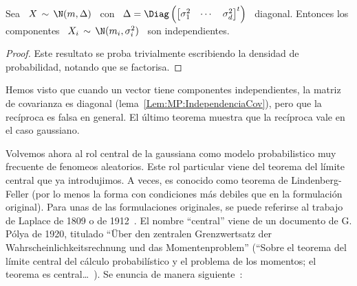 %
\begin{teorema}[Independencia]
\label{Teo:MP:IndependenciaGaussiana}
%
  Sea   \   $X  \,   \sim   \,   \N(m,\Delta)$  \   con   \   $\Delta  =   \Diag
  \left(  \begin{bmatrix}  \sigma_1^2  &  \cdots  &  \sigma_d^2  \end{bmatrix}^t
  \right)$   \  diagonal.   Entonces  los   componentes  \   $X_i  \,   \sim  \,
  \N(m_i,\sigma_i^2)$ \ son independientes.
\end{teorema}
%
\begin{proof}
  Este resultato se proba  trivialmente escribiendo la densidad de probabilidad,
  notando que se factorisa.
\end{proof}
%
Hemos visto que cuando un  vector tiene componentes independientes, la matriz de
covarianza  es   diagonal  (lema~\ref{Lem:MP:IndependenciaCov}),  pero   que  la
rec\'iproca es falsa en general.  El \'ultimo teorema muestra que la rec\'iproca
vale en el caso gaussiano.

Volvemos  ahora al rol  central de  la gaussiana  como modelo  probabilistico muy
frecuente  de fenomeos  aleatorios. Este  rol particular  viene del  teorema del
l\'imite  central que  ya introdujimos.  A veces,  es conocido  como  teorema de
Lindenberg-Feller (por lo menos la forma con condiciones m\'as debiles que en la
formulaci\'on original).   Para unas de  las formulaciones originales,  se puede
referirse  al trabajo  de Laplace  de  1809 o  de 1912~\cite{Lap09,  Lap09:Supp,
  Lap12,  Lap14, Lap20}.   El nombre  ``central'' viene  de un  documento  de G.
P\'olya   de   1920,  titulado   ``\"Uber   den   zentralen  Grenzwertsatz   der
Wahrscheinlichkeitsrechnung  und das Momentenproblem''  (``Sobre el  teorema del
l\'imite central del  c\'alculo probabil\'istico y el problema  de los momentos;
el  teorema  es  central\ldots~\cite{Pol20,   Cam86}).   Se  enuncia  de  manera
siguiente~\cite{Spi76, BroDav87, LehCas98, AshDol99, JacPro03, AthLah06, Bil12}:

